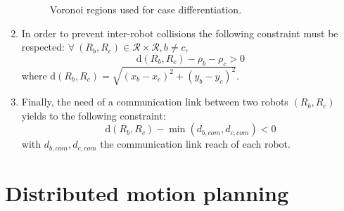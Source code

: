 \documentclass[eprint]{actapoly}
\begin{document}
\begin{enumerate}
\begin{figure}[!h]
{}
	\caption{Voronoi regions used for case differentiation. \label{fig:convexpolygon}}
	\end{figure}

    \item 
    In order to prevent inter-robot collisions the following constraint must be respected:
    $\forall\ (R_b, R_c) \in \mathcal{R} \times \mathcal{R}, b\neq c$,
    \begin{equation}\label{eq:coll}
	    \mathrm{d}(R_b,R_c) - \rho_b -\rho_c > 0
    \end{equation}
    where $\mathrm{d}(R_b,R_c) = \sqrt{(x_{b} - x_{c})^2 + (y_{b} - y_{c})^2}$.
    
    
    \item Finally, the need of a communication link between two robots $(R_b, R_c)$ yields to
    the following constraint:
    \begin{equation}\label{eq:com}
    	\mathrm{d}(R_b,R_c)  - \min(d_{b,com}, d_{c,com}) < 0
    \end{equation}
    with $d_{b,com}, d_{c,com}$ the communication link reach of each robot.
\end{enumerate}
\newpage
\mbox{}\newpage



\section{Distributed motion planning}
\end{document}
